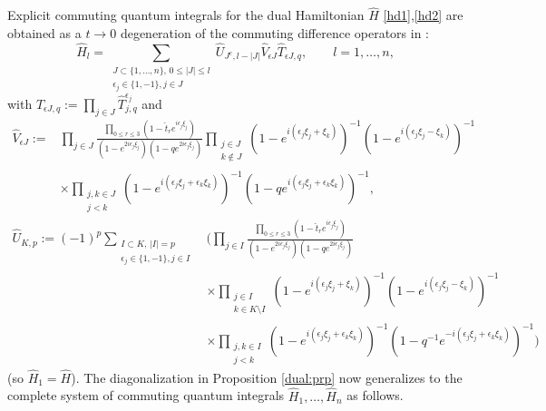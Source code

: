 \documentclass[reqno]{amsart}
\theoremstyle{remark}
\numberwithin{equation}{section}
\begin{document}
Explicit commuting quantum integrals for the dual Hamiltonian $\hat{H}$  \eqref{hd1},\eqref{hd2} are obtained as a $t\to 0$ degeneration of the commuting difference operators in  \cite[~5.1]{die:properties}:
\begin{equation}\label{dual-int}
\hat{H}_l= 
\sum_{\substack{ J\subset \{ 1,\ldots ,n\},\, 0\leq |J|\leq l \\ \epsilon_j\in\{ 1,-1\},j\in J}} \hat{U}_{J^c,l -|J|}\hat{V}_{\epsilon J} \hat{T}_{\epsilon J,q},\qquad l=1,\ldots ,n,
\end{equation}
with $\hat{T}_{\epsilon J,q}:=\prod_{j\in J} \hat{T}_{j,q}^{\epsilon_j}$ and
\begin{align*}
\hat{V}_{\epsilon J} := &
\prod_{j\in J}  \frac{\prod_{0\leq r\leq 3} (1-\hat{t}_re^{i\epsilon_j\xi_j}) }{(1-e^{2i\epsilon_j\xi_j})  (1-q e^{2i\epsilon_j\xi_j}) } \prod_{\substack{j\in J \\k\not\in J}} (1-e^{i(\epsilon_j\xi_j+\xi_k)})^{-1}(1-e^{i(\epsilon_j \xi_j-\xi_k)})^{-1}
 \\
& \times \prod_{\substack{j,k\in J \\ j<k}} (1-e^{i(\epsilon_j\xi_j+\epsilon_k \xi_k)})^{-1}(1-qe^{i(\epsilon_j \xi_j+\epsilon_k\xi_k)})^{-1} ,
\end{align*}
\begin{align*}
\hat{U}_{K,p} :=  (-1)^p 
\sum_{\substack{ I \subset K,\,  | I | = p\\ \epsilon_j\in\{ 1,-1\},j\in I}} 
& \bigg( 
 \prod_{j\in I}  \frac{\prod_{0\leq r\leq 3} (1-\hat{t}_re^{i\epsilon_j\xi_j}) }{(1-e^{2i\epsilon_j\xi_j})  (1-q e^{2i\epsilon_j\xi_j}) } \\
&\times   \prod_{\substack{j\in I \\k\in K\setminus I}} (1-e^{i(\epsilon_j\xi_j+\xi_k)})^{-1}(1-e^{i(\epsilon_j \xi_j-\xi_k)})^{-1} \\
 & \times \prod_{\substack{j,k\in I \\ j<k}} (1-e^{i(\epsilon_j\xi_j+\epsilon_k \xi_k)})^{-1}(1-q^{-1}e^{-i(\epsilon_j \xi_j+\epsilon_k\xi_k)})^{-1} \bigg) 
\end{align*}
(so $\hat{H}_1=\hat{H}$). 
The diagonalization in Proposition \ref{dual:prp} now generalizes to the complete system of commuting quantum integrals $\hat{H}_1,\ldots ,\hat{H}_n$ as follows.
\end{document}
